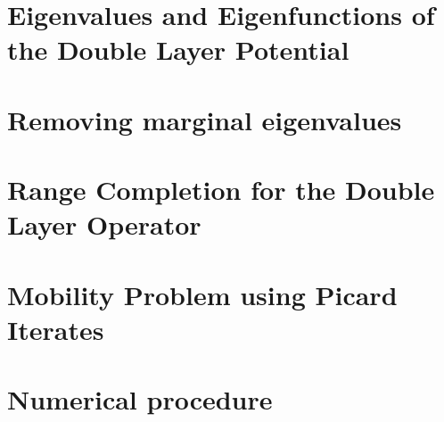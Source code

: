 \documentclass[12pt]{article}
\begin{document}
\section{Eigenvalues and Eigenfunctions of the Double Layer Potential}

\section{Removing marginal eigenvalues}

\section{Range Completion for the Double Layer Operator}

\section{Mobility Problem using Picard Iterates}

\section{Numerical procedure}
\end{document}
